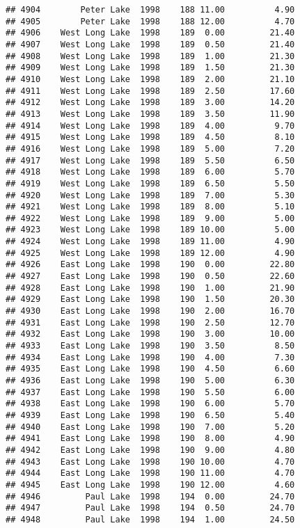 \documentclass[
]{article}
\begin{document}
\begin{verbatim}
## 4904        Peter Lake  1998    188 11.00          4.90
## 4905        Peter Lake  1998    188 12.00          4.70
## 4906    West Long Lake  1998    189  0.00         21.40
## 4907    West Long Lake  1998    189  0.50         21.40
## 4908    West Long Lake  1998    189  1.00         21.30
## 4909    West Long Lake  1998    189  1.50         21.30
## 4910    West Long Lake  1998    189  2.00         21.10
## 4911    West Long Lake  1998    189  2.50         17.60
## 4912    West Long Lake  1998    189  3.00         14.20
## 4913    West Long Lake  1998    189  3.50         11.90
## 4914    West Long Lake  1998    189  4.00          9.70
## 4915    West Long Lake  1998    189  4.50          8.10
## 4916    West Long Lake  1998    189  5.00          7.20
## 4917    West Long Lake  1998    189  5.50          6.50
## 4918    West Long Lake  1998    189  6.00          5.70
## 4919    West Long Lake  1998    189  6.50          5.50
## 4920    West Long Lake  1998    189  7.00          5.30
## 4921    West Long Lake  1998    189  8.00          5.10
## 4922    West Long Lake  1998    189  9.00          5.00
## 4923    West Long Lake  1998    189 10.00          5.00
## 4924    West Long Lake  1998    189 11.00          4.90
## 4925    West Long Lake  1998    189 12.00          4.90
## 4926    East Long Lake  1998    190  0.00         22.80
## 4927    East Long Lake  1998    190  0.50         22.60
## 4928    East Long Lake  1998    190  1.00         21.90
## 4929    East Long Lake  1998    190  1.50         20.30
## 4930    East Long Lake  1998    190  2.00         16.70
## 4931    East Long Lake  1998    190  2.50         12.70
## 4932    East Long Lake  1998    190  3.00         10.00
## 4933    East Long Lake  1998    190  3.50          8.50
## 4934    East Long Lake  1998    190  4.00          7.30
## 4935    East Long Lake  1998    190  4.50          6.60
## 4936    East Long Lake  1998    190  5.00          6.30
## 4937    East Long Lake  1998    190  5.50          6.00
## 4938    East Long Lake  1998    190  6.00          5.70
## 4939    East Long Lake  1998    190  6.50          5.40
## 4940    East Long Lake  1998    190  7.00          5.20
## 4941    East Long Lake  1998    190  8.00          4.90
## 4942    East Long Lake  1998    190  9.00          4.80
## 4943    East Long Lake  1998    190 10.00          4.70
## 4944    East Long Lake  1998    190 11.00          4.70
## 4945    East Long Lake  1998    190 12.00          4.60
## 4946         Paul Lake  1998    194  0.00         24.70
## 4947         Paul Lake  1998    194  0.50         24.70
## 4948         Paul Lake  1998    194  1.00         24.50

\end{verbatim}
\end{document}

